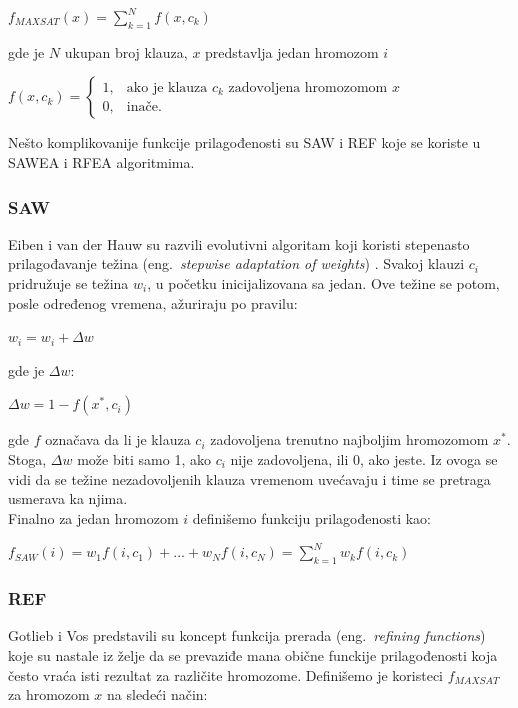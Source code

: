 \documentclass[a4paper]{article}
\begin{document}
	\begin{center}
	$ f_{MAXSAT} (x) = \sum_{k=1}^{N} f(x, c_k) $
	\end{center} 
	
gde je $N$ ukupan broj klauza, $x$ predstavlja jedan hromozom $i$

	\begin{center}
$ f(x, c_k) = \begin{cases} 1, & \mbox{ako je klauza } c_k \mbox{ zadovoljena hromozomom } x \\ 0, & \mbox{inače.} \end{cases} $
	\end{center}
Nešto komplikovanije funkcije prilagođenosti su SAW i REF koje se koriste
u SAWEA i RFEA algoritmima.


\subsubsection{SAW}
\label{sec:fitness_saw}
Eiben i van der Hauw su razvili evolutivni algoritam koji koristi 
stepenasto prilagođavanje težina (eng.~{\em stepwise adaptation of weights}) 
\cite{fitnes}. Svakoj klauzi $c_i$ pridružuje se težina 
$w_i$, u početku inicijalizovana sa jedan. Ove težine se potom, 
posle određenog vremena, ažuriraju po pravilu:  
	\begin{center}
	$ w_i = w_i + \Delta w $
	\end{center}
gde je $\Delta w$:
	\begin{center}
	$ \Delta w = 1 - f(x^*, c_i) $
	\end{center}
gde $f$ označava da li je klauza $c_i$ zadovoljena trenutno najboljim
hromozomom $x^*$. Stoga, $\Delta w$ može biti samo 1, ako $c_i$ nije zadovoljena, 
ili 0, ako jeste. Iz ovoga se vidi da se težine nezadovoljenih klauza vremenom uvećavaju
i time se pretraga usmerava ka njima. \\

Finalno za jedan hromozom $ i $ definišemo funkciju prilagođenosti kao:

	\begin{center}
	$ f_{SAW}(i) = w_1 f(i, c_1) + ... + w_N f(i, c_N) = \sum_{k=1}^{N} w_k f(i, c_k)	$
	\end{center}


\subsubsection{REF}
\label{sec:fitness_rfea}
Gotlieb i Vos \cite{GotVos98_f_ref} predstavili su koncept funkcija prerada 
(eng.~{\em refining functions}) koje su nastale iz želje da se prevaziđe mana obične 
funckije prilagođenosti koja često vraća isti rezultat za različite hromozome. 
Definišemo je koristeci $f_{MAXSAT}$ za hromozom $x$ na sledeći način:
\end{document}
